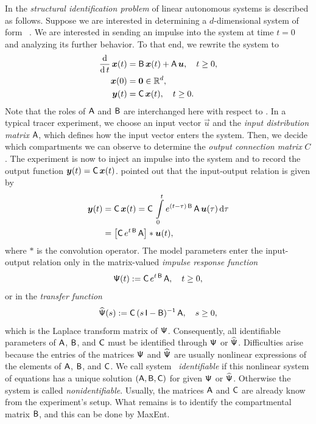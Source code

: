 \documentclass[smallextended]{svjour3}
\makeatletter
\renewcommand*{\eqref}[1]{%
  \hyperref[{#1}]{\textup{\tagform@{\ref*{#1}}}}%
}
\newcommand{\R}{\mathbb{R}}
\newcommand{\intl}{\int\limits}
\newcommand{\deriv}[1]{\frac{\operatorname{d}}{\operatorname{d}#1}}
\newcommand{\dd}[1]{\,\mathrm{d}#1}
\makeatother
\begin{document}
In \citet[Chapter~16]{Anderson1983} the \emph{structural identification problem} of linear autonomous systems is described as follows.
Suppose we are interested in determining a $d$-dimensional system of form~\eqref{eqn:lin_CS_sys}.
We are interested in sending an impulse into the system at time $t=0$ and analyzing its further behavior.
To that end, we rewrite the system to
\begin{equation}\label{eqn:ABC_system}
	\begin{aligned}
		\deriv{t}\,\vec{x}(t) &= \tens{B}\,\vec{x}(t) + \tens{A}\,\vec{u},	\quad t\geq0,\\
		\vec{x}(0) &= \vec{0}\in\R^d,\\
		\vec{y}(t) &= \tens{C}\,\vec{x}(t),\quad t\geq0.
	\end{aligned}
\end{equation}
Note that the roles of $\mathsf{A}$ and $\mathsf{B}$ are interchanged here with respect to \citet{Anderson1983}.
In a typical tracer experiment, we choose an input vector $\vec{u}$ and the \emph{input distribution matrix} $\mathsf{A}$, which defines how the input vector enters the system.
Then, we decide which compartments we can observe to determine the \emph{output connection matrix} $C$.
The experiment is now to inject an impulse into the system and to record the output function $\vec{y}(t) =\tens{C}\,\vec{x}(t)$.
\citet{Bellman1970MBS} pointed out that the input-output relation is given by
\begin{align*}
	\vec{y}(t) &= \tens{C}\,\vec{x}(t) = \tens{C}\,\intl_0^t e^{(t-\tau)\,\tens{B}}\,\tens{A}\,\vec{u}(\tau)\dd{\tau}\\
	&= \left[\tens{C}\,e^{t\,\tens{B}}\,\tens{A}\right] * \vec{u}(t),
\end{align*}
where $*$ is the convolution operator.
The model parameters enter the input-output relation only in the matrix-valued \emph{impulse response function}
\begin{equation*}
	\mathsf{\Psi}(t):=\mathsf{C}\,e^{t\,\mathsf{B}}\,\mathsf{A},\quad t\geq0,
\end{equation*}
or in the \emph{transfer function}
\begin{equation*}
	\widehat{\mathsf{\Psi}}(s) := \mathsf{C}\,(s\,\mathsf{I}-\mathsf{B})^{-1}\,\mathsf{A}, \quad s\geq0,
\end{equation*}
which is the Laplace transform matrix of $\mathsf{\Psi}$.
Consequently, all identifiable parameters of $\mathsf{A}$, $\mathsf{B}$, and $\mathsf{C}$ must be identified through $\mathsf{\Psi}$ or $\widehat{\mathsf{\Psi}}$.
Difficulties arise because the entries of the matrices $\mathsf{\Psi}$ and $\widehat{\mathsf{\Psi}}$ are usually nonlinear expressions of the elements of $\mathsf{A}$, $\mathsf{B}$, and $\mathsf{C}$.
We call system~\eqref{eqn:ABC_system} \emph{identifiable} if this nonlinear system of equations has a unique solution $(\mathsf{A},\mathsf{B},\mathsf{C})$ for given $\mathsf{\Psi}$ or $\widehat{\mathsf{\Psi}}$.
Otherwise the system is called \emph{nonidentifiable}.
Usually, the matrices $\mathsf{A}$ and $\mathsf{C}$ are already know from the experiment's setup.
What remains is to identify the compartmental matrix $\mathsf{B}$, and this can be done by MaxEnt.
\end{document}
